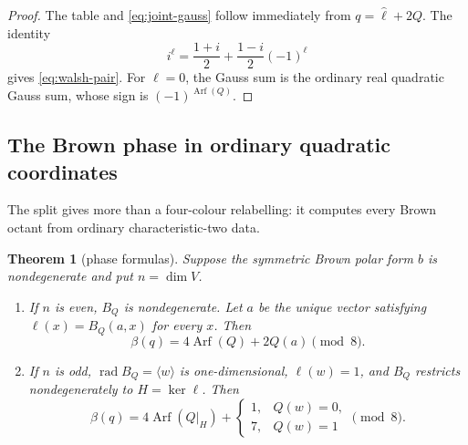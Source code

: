 \documentclass[11pt]{article}
\newtheorem{theorem}{Theorem}
\theoremstyle{definition}
\theoremstyle{remark}
\newcommand{\Arf}{\operatorname{Arf}}
\begin{document}
\begin{proof}
The table and \eqref{eq:joint-gauss} follow immediately from
$q=\widehat\ell+2Q$.  The identity
\[
 i^{\ell}=\frac{1+i}{2}+\frac{1-i}{2}(-1)^{\ell}
\]
gives \eqref{eq:walsh-pair}.  For $\ell=0$, the Gauss sum is the ordinary
real quadratic Gauss sum, whose sign is $(-1)^{\Arf(Q)}$.
\end{proof}

\subsection{The Brown phase in ordinary quadratic coordinates}

The split gives more than a four-colour relabelling: it computes every Brown
octant from ordinary characteristic-two data.

\begin{theorem}[phase formulas]\label{thm:phase}
Suppose the symmetric Brown polar form $b$ is nondegenerate and put
$n=\dim V$.
\begin{enumerate}[label=(\roman*),leftmargin=2.5em]
\item If $n$ is even, $B_Q$ is nondegenerate.  Let $a$ be the unique vector
      satisfying $\ell(x)=B_Q(a,x)$ for every $x$.  Then
      \begin{equation}\label{eq:even-beta}
       \beta(q)=4\Arf(Q)+2Q(a)\pmod8.
      \end{equation}
\item If $n$ is odd, $\operatorname{rad}B_Q=\langle w\rangle$ is
      one-dimensional, $\ell(w)=1$, and $B_Q$ restricts nondegenerately to
      $H=\ker\ell$.  Then
      \begin{equation}\label{eq:odd-beta}
       \beta(q)=4\Arf(Q|_H)+
       \begin{cases}
       1,&Q(w)=0,\\
       7,&Q(w)=1
       \end{cases}
       \pmod8.
      \end{equation}
\end{enumerate}
\end{theorem}
\end{document}
